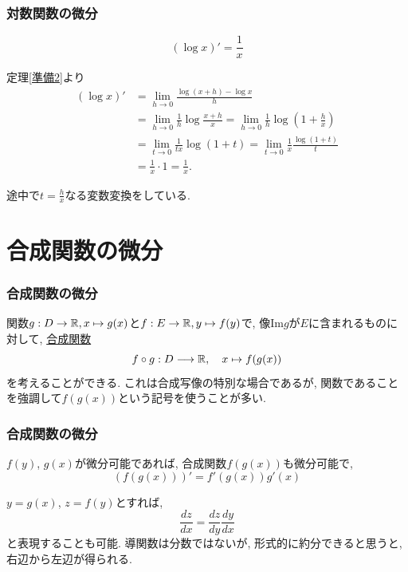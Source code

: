 \begin{frame}
\frametitle{対数関数の微分}


\begin{Thm} 
$$(\log x)'=\frac{1}{x}$$
\end{Thm}

定理\ref{準備2}より \vspace{-2mm}
\begin{align*} 
(\log x)' &= \lim_{h\to0}\frac{\log(x+h)-\log x}{h} \\
&= \lim_{h\to0}\frac{1}{h} \log \frac{x+h}{x} = \lim_{h\to0}\frac{1}{h} \log (1+\frac{h}{x}) \\
&= \lim_{t\to0}\frac{1}{tx} \log (1+t) = \lim_{t\to0}\frac{1}{x} \frac{\log (1+t)}{t} \\
&=\frac{1}{x}\cdot 1=\frac{1}{x}. 
\end{align*}

途中で$t=\frac{h}{x}$なる変数変換をしている. 

\end{frame}




\section{合成関数の微分}

\begin{frame}
\frametitle{合成関数の微分}

関数$g:D \rightarrow \mathbb{R}, x\mapsto g(x)$と$f:E\rightarrow \mathbb{R}, y\mapsto f(y)$で, 像$\mathrm{Im}g$が$E$に含まれるものに対して, 
\underline{合成関数}
$$
f\circ g:D \longrightarrow \mathbb{R}, \ \ \ x \mapsto f(g(x))
$$
を考えることができる. 
これは合成写像の特別な場合であるが, 関数であることを強調して$f(g(x))$という記号を使うことが多い. 


\end{frame}




\begin{frame}
\frametitle{合成関数の微分}


\begin{Thm} \label{合成関数}
$f(y)$, $g(x)$が微分可能であれば, 合成関数$f(g(x))$も微分可能で, 
$$
(f(g(x)))'=f'(g(x))g'(x)
$$
\end{Thm}
$y=g(x)$, $z=f(y)$とすれば, 
$$
\frac{dz}{dx}=\frac{dz}{dy} \frac{dy}{dx}
$$
と表現することも可能. 
導関数は分数ではないが, 形式的に約分できると思うと, 右辺から左辺が得られる. 

\end{frame}


